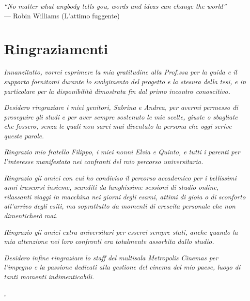 \cleardoublepage
{}
{}

\begin{flushright}{
    \slshape
    ``No matter what anybody tells you, words and ideas can change the world''} \\
    \medskip
    --- Robin Williams (L'attimo fuggente)
\end{flushright}


\bigskip

\begingroup
\let\clearpage\relax
\let\cleardoublepage\relax
\let\cleardoublepage\relax

\chapter*{Ringraziamenti}

\textit{Innanzitutto, vorrei esprimere la mia gratitudine alla Prof.ssa \myProf{} per la guida e il supporto fornitomi durante lo svolgimento del progetto e la stesura della tesi, e in particolare per la disponibilità dimostrata fin dal primo incontro conoscitivo.}

\vspace{10pt}
\noindent \textit{Desidero ringraziare i miei genitori, Sabrina e Andrea, per avermi permesso di proseguire gli studi e per aver sempre sostenuto le mie scelte, giuste o sbagliate che fossero, senza le quali non sarei mai diventato la persona che oggi scrive queste parole.}

\vspace{10pt}
\noindent \textit{Ringrazio mio fratello Filippo, i miei nonni Elvia e Quinto, e tutti i parenti per l’interesse manifestato nei confronti del mio percorso universitario.}

\vspace{10pt}
\par\noindent \textit{Ringrazio gli amici con cui ho condiviso il percorso accademico per i bellissimi anni trascorsi insieme, scanditi da lunghissime sessioni di studio online, rilassanti viaggi in macchina nei giorni degli esami, attimi di gioia o di sconforto all’arrivo degli esiti, ma soprattutto da momenti di crescita personale che non dimenticherò mai.}

\vspace{10pt}
\noindent \textit{Ringrazio gli amici extra-universitari per esserci sempre stati, anche quando la mia attenzione nei loro confronti era totalmente assorbita dallo studio.}

\vspace{10pt}
\noindent \textit{Desidero infine ringraziare lo staff del multisala Metropolis Cinemas per l’impegno e la passione dedicati alla gestione del cinema del mio paese, luogo di tanti momenti indimenticabili.}

\bigskip

\noindent\textit{\myLocation, \myTime}
\hfill \myName

\endgroup
